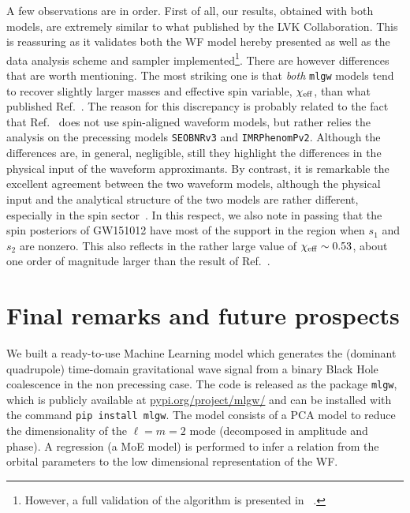 \documentclass[twocolumn,showpacs,preprintnumbers,nofootinbib,prd,
superscriptaddress,10pt]{revtex4-1}
\begin{document}
A few observations are in order. First of all, our results, obtained with both models,
are extremely similar to what published by the LVK Collaboration. 
This is reassuring as it validates both the WF model hereby presented 
as well as the data analysis scheme and sampler 
implemented\footnote{However, a full validation of the algorithm is presented in ~\cite{gwmodel}.}.
There are however differences that are worth mentioning. The most striking one is that
{\it both} \texttt{mlgw} models tend to recover slightly larger masses and effective 
spin variable, $\chi_{\rm eff}$, than what published Ref.~\cite{LIGOScientific:2018mvr}.
The reason for this discrepancy is probably related to the fact that Ref.~\cite{LIGOScientific:2018mvr}
does not use spin-aligned waveform models, but rather relies the analysis on 
the precessing models \texttt{SEOBNRv3} and \texttt{IMRPhenomPv2}. Although the differences 
are, in general, negligible, still they highlight the differences in the physical input of 
the waveform approximants. By contrast, it is remarkable the excellent agreement between the
two waveform models, although the physical input and the analytical structure of the
two models are rather different, especially in the spin sector~\cite{Rettegno:2019tzh}.
In this respect, we also note in passing that the spin posteriors of GW151012 have
most of the support in the region when $s_1$ and $s_2$ are nonzero. This also
reflects in the rather large value of $\chi_{\rm eff}\sim 0.53$, about one order of magnitude
larger than the result of Ref.~\cite{LIGOScientific:2018mvr}.

\section{Final remarks and future prospects}
\label{sec:end}
We built a ready-to-use Machine Learning model which generates the (dominant quadrupole) time-domain gravitational wave 
signal from a binary Black Hole coalescence in the non precessing case. The code is released as the package \texttt{mlgw}, which is publicly available at 
\href{https://pypi.org/project/mlgw/}{pypi.org/project/mlgw/} and can be installed with the command \texttt{pip install mlgw}.
The model consists of a PCA model to reduce the dimensionality of the $\ell=m=2$ mode (decomposed in amplitude and phase). 
A regression (a MoE model) is performed to infer a relation from the orbital parameters to the low dimensional representation of the WF.
\end{document}
